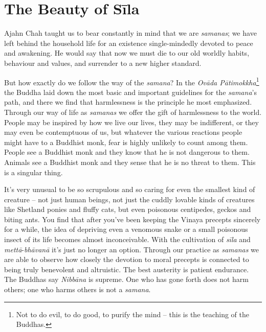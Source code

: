 

\chapter{The Beauty of Sīla}
\markright{\chapterAuthor}

Ajahn Chah taught us to bear constantly in mind that we are
\emph{samanas}; we have left behind the household life for an existence
single-mindedly devoted to peace and awakening. He would say that now we
must die to our old worldly habits, behaviour and values, and surrender
to a new higher standard.

But how exactly do we follow the way of the \emph{samana}? In the
\emph{Ovāda Pātimokkha}\footnote{Not to do evil, to do good, to purify
  the mind -- this is the teaching of the Buddhas.} the Buddha laid
down the most basic and important guidelines for the \emph{samana}'s
path, and there we find that harmlessness is the principle he most
emphasized. Through our way of life as \emph{samanas} we offer the gift
of harmlessness to the world. People may be inspired by how we live our
lives, they may be indifferent, or they may even be contemptuous of us,
but whatever the various reactions people might have to a Buddhist monk,
fear is highly unlikely to count among them. People see a Buddhist monk
and they know that he is not dangerous to them. Animals see a Buddhist
monk and they sense that he is no threat to them. This is a singular
thing.

It's very unusual to be so scrupulous and so caring for even the
smallest kind of creature -- not just human beings, not just the cuddly
lovable kinds of creatures like Shetland ponies and fluffy cats, but
even poisonous centipedes, geckos and biting ants. You find that after
you've been keeping the Vinaya precepts sincerely for a while, the idea
of depriving even a venomous snake or a small poisonous insect of its
life becomes almost inconceivable. With the cultivation of \emph{sīla}
and \emph{mettā}-\emph{bhāvanā} it's just no longer an option. Through
our practice as \emph{samanas} we are able to observe how closely the
devotion to moral precepts is connected to being truly benevolent and
altruistic. The best austerity is patient endurance. The Buddhas say
\emph{Nibbāna} is supreme. One who has gone forth does not harm others;
one who harms others is not a \emph{samana}.


